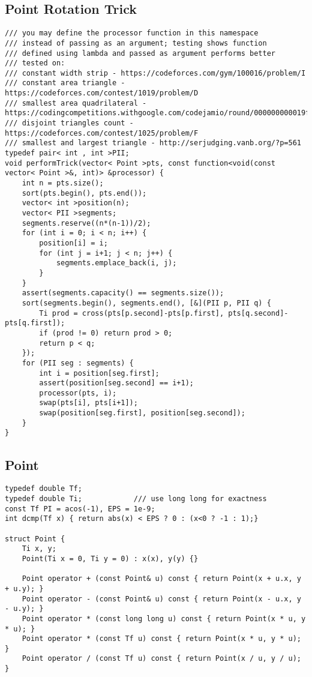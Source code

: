 \documentclass[FSZ,a4paper,onesided]{article}
\begin{document}
\begin{multicols*}{\COLS}
\subsection{Point Rotation Trick}
\begin{lstlisting}
/// you may define the processor function in this namespace
/// instead of passing as an argument; testing shows function
/// defined using lambda and passed as argument performs better
/// tested on:
/// constant width strip - https://codeforces.com/gym/100016/problem/I
/// constant area triangle - https://codeforces.com/contest/1019/problem/D
/// smallest area quadrilateral - https://codingcompetitions.withgoogle.com/codejamio/round/000000000019ff03/00000000001b5e89
/// disjoint triangles count - https://codeforces.com/contest/1025/problem/F
/// smallest and largest triangle - http://serjudging.vanb.org/?p=561
typedef pair< int , int >PII;
void performTrick(vector< Point >pts, const function<void(const vector< Point >&, int)> &processor) {
    int n = pts.size();
    sort(pts.begin(), pts.end());
    vector< int >position(n);
    vector< PII >segments;
    segments.reserve((n*(n-1))/2);
    for (int i = 0; i < n; i++) {
        position[i] = i;
        for (int j = i+1; j < n; j++) {
            segments.emplace_back(i, j);
        }
    }
    assert(segments.capacity() == segments.size());
    sort(segments.begin(), segments.end(), [&](PII p, PII q) {
        Ti prod = cross(pts[p.second]-pts[p.first], pts[q.second]-pts[q.first]);
        if (prod != 0) return prod > 0;
        return p < q;
    });
    for (PII seg : segments) {
        int i = position[seg.first];
        assert(position[seg.second] == i+1);
        processor(pts, i);
        swap(pts[i], pts[i+1]);
        swap(position[seg.first], position[seg.second]);
    }
}\end{lstlisting}
\subsection{Point}
\begin{lstlisting}
typedef double Tf;
typedef double Ti;            /// use long long for exactness
const Tf PI = acos(-1), EPS = 1e-9;
int dcmp(Tf x) { return abs(x) < EPS ? 0 : (x<0 ? -1 : 1);}
 
struct Point {
    Ti x, y;
    Point(Ti x = 0, Ti y = 0) : x(x), y(y) {}
 
    Point operator + (const Point& u) const { return Point(x + u.x, y + u.y); }
    Point operator - (const Point& u) const { return Point(x - u.x, y - u.y); }
    Point operator * (const long long u) const { return Point(x * u, y * u); }
    Point operator * (const Tf u) const { return Point(x * u, y * u); }
    Point operator / (const Tf u) const { return Point(x / u, y / u); }
 

\end{lstlisting}
\end{multicols*}
\end{document}
